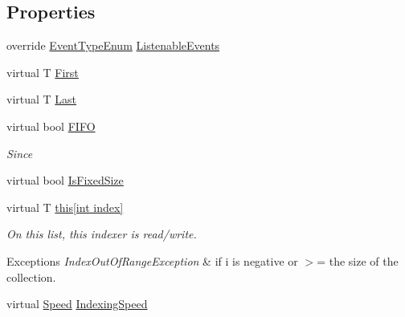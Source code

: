 \subsection*{Properties}
\begin{DoxyCompactItemize}
\item 
override \hyperlink{namespace_c5_a9143bfd561fffa025d21561674758008}{Event\+Type\+Enum} \hyperlink{class_c5_1_1_linked_list_a74b0982297f6197bdac1720f4d8c4d05}{Listenable\+Events}
\item 
virtual T \hyperlink{class_c5_1_1_linked_list_a4b3b848cb2d2830e547d667ccf4fe7e2}{First}
\item 
virtual T \hyperlink{class_c5_1_1_linked_list_a7070dde3b79d8031dfd0a708c660f02d}{Last}
\item 
virtual bool \hyperlink{class_c5_1_1_linked_list_ac6d581d8bb85903ee40b32b056dd25a2}{F\+I\+F\+O}
\begin{DoxyCompactList}\small\item\em Since \end{DoxyCompactList}\item 
virtual bool \hyperlink{class_c5_1_1_linked_list_ab20e4a1a12a710451376c6c596123f0a}{Is\+Fixed\+Size}
\item 
virtual T \hyperlink{class_c5_1_1_linked_list_a53eaba62445837a11f27c947199ae408}{this\mbox{[}int index\mbox{]}}
\begin{DoxyCompactList}\small\item\em On this list, this indexer is read/write. 
\begin{DoxyExceptions}{Exceptions}
{\em Index\+Out\+Of\+Range\+Exception} & if i is negative or $>$= the size of the collection. \\
\hline
\end{DoxyExceptions}
\end{DoxyCompactList}\item 
virtual \hyperlink{namespace_c5_a615ba88dcdaa8d5a3c5f833a73d7fad6}{Speed} \hyperlink{class_c5_1_1_linked_list_ab49ff1340cad026919b2e03a615e25f0}{Indexing\+Speed}

\end{DoxyCompactItemize}
